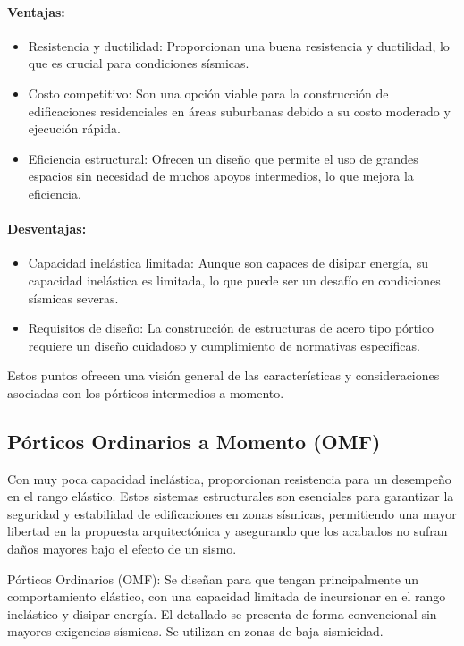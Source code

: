 \documentclass[14pt,letterpaper]{extarticle}
\begin{document}
	
	\paragraph{Ventajas:}
	\begin{itemize}
		\item Resistencia y ductilidad: Proporcionan una buena resistencia y ductilidad, lo que es crucial para condiciones sísmicas.
		\item Costo competitivo: Son una opción viable para la construcción de edificaciones residenciales en áreas suburbanas debido a su costo moderado y ejecución rápida.
		\item Eficiencia estructural: Ofrecen un diseño que permite el uso de grandes espacios sin necesidad de muchos apoyos intermedios, lo que mejora la eficiencia.
	\end{itemize}
	
	\paragraph{Desventajas:}
	\begin{itemize}
		\item Capacidad inelástica limitada: Aunque son capaces de disipar energía, su capacidad inelástica es limitada, lo que puede ser un desafío en condiciones sísmicas severas.
		\item Requisitos de diseño: La construcción de estructuras de acero tipo pórtico requiere un diseño cuidadoso y cumplimiento de normativas específicas.
	\end{itemize}
	
	Estos puntos ofrecen una visión general de las características y consideraciones asociadas con los pórticos intermedios a momento.
	
	\subsection{Pórticos Ordinarios a Momento (OMF)}
	
	Con muy poca capacidad inelástica, proporcionan resistencia para un desempeño en el rango elástico. Estos sistemas estructurales son esenciales para garantizar la seguridad y estabilidad de edificaciones en zonas sísmicas, permitiendo una mayor libertad en la propuesta arquitectónica y asegurando que los acabados no sufran daños mayores bajo el efecto de un sismo.
	
	Pórticos Ordinarios (OMF): Se diseñan para que tengan principalmente un comportamiento elástico, con una capacidad limitada de incursionar en el rango inelástico y disipar energía. El detallado se presenta de forma convencional sin mayores exigencias sísmicas. Se utilizan en zonas de baja sismicidad.
	
\end{document}
